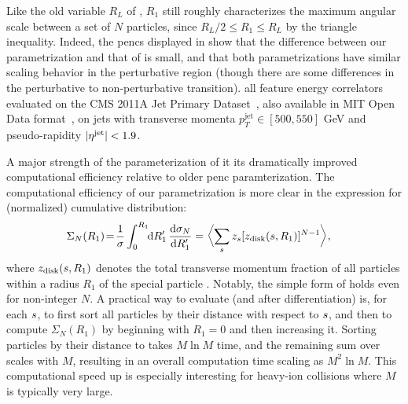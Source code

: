 \indent
Like the old variable \(R_L\) of , \(R_1\) still roughly characterizes the maximum angular scale between a set of \(N\) particles, since \(R_L/2 \leq R_1 \leq R_L\) by the triangle inequality.
%
Indeed, the \glspl{penc} displayed in  show that the difference between our parametrization and that of  is small, and that both parametrizations have similar scaling behavior in the perturbative region (though there are some differences in the perturbative to non-perturbative transition).
%
 all feature energy correlators evaluated on the CMS 2011A Jet Primary Dataset~\cite{CERNOpenDataPortal, CMS:JetPrimary2011A}, also available in MIT Open Data format~\cite{Komiske:2019jim, komiske_patrick_2019_3340205}, on jets with transverse momenta $p_{T}^{\text{jet}} \in [500, 550]$ GeV and pseudo-rapidity $\vert \eta^{\rm jet} \vert < 1.9$.

\indent
A major strength of the parameterization of  it its dramatically improved computational efficiency relative to older \gls{penc} paramterization.
%
The computational efficiency of our parametrization is more clear in the expression for (normalized) cumulative distribution:
\begin{align} \label{eq:new_cml}
  \Sigma_N(R_1)
  \!
  &=
  \!
  \frac{1}{\sigma}
  \int_0^{R_1}
  \!\!
  \dd R_1'
  \,
  \frac{\dd \sigma_N}{\dd R_1'}
  =
  \biggl\langle \sum_{\izero} z_{\izero} [z_{\rm disk}(\izero,R_1)]^{N-1}
  \biggr\rangle
  ,
\end{align}
where $z_{\rm disk}(\izero,R_1)$ denotes the total transverse momentum fraction of all particles within a radius $R_1$ of the special particle \izero{}.
%
Notably, the simple form of  holds even for non-integer $N$.
%
A practical way to evaluate  (and  after differentiation) is, for each $\izero$, to first sort all particles by their distance with respect to $\izero$, and then to compute $\Sigma_N(R_1)$ by beginning with $R_1=0$ and then increasing it.
%
Sorting particles by their distance to \izero{} takes $M\ln M$ time, and the remaining sum over \izero{} scales with $M$, resulting in an overall computation time scaling as $M^2 \ln M$.
%
This computational speed up is especially interesting for heavy-ion collisions where $M$ is typically very large.


